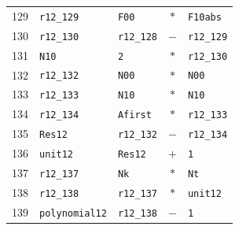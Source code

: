 \begin{longtable}{rllcl}
129 & \texttt{r12\_129} & \texttt{F00} & $*$ & \texttt{F10abs}\\
130 & \texttt{r12\_130} & \texttt{r12\_128} & $-$ & \texttt{r12\_129}\\
131 & \texttt{N10} & \texttt{2} & $*$ & \texttt{r12\_130}\\
132 & \texttt{r12\_132} & \texttt{N00} & $*$ & \texttt{N00}\\
133 & \texttt{r12\_133} & \texttt{N10} & $*$ & \texttt{N10}\\
134 & \texttt{r12\_134} & \texttt{Afirst} & $*$ & \texttt{r12\_133}\\
135 & \texttt{Res12} & \texttt{r12\_132} & $-$ & \texttt{r12\_134}\\
136 & \texttt{unit12} & \texttt{Res12} & $+$ & \texttt{1}\\
137 & \texttt{r12\_137} & \texttt{Nk} & $*$ & \texttt{Nt}\\
138 & \texttt{r12\_138} & \texttt{r12\_137} & $*$ & \texttt{unit12}\\
139 & \texttt{polynomial12} & \texttt{r12\_138} & $-$ & \texttt{1}\\
\bottomrule\end{longtable}
\endgroup
